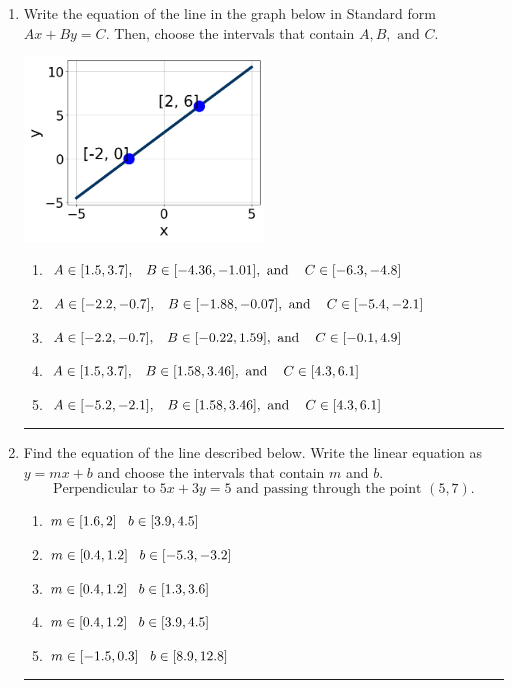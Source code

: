 \documentclass[14pt]{extbook}
\newcommand{\litem}[1]{\item#1\hspace*{-1cm}\rule{\textwidth}{0.4pt}}
\begin{document}
\begin{enumerate}
\litem{
Write the equation of the line in the graph below in Standard form $Ax+By=C$. Then, choose the intervals that contain $A, B, \text{ and } C$.
\begin{center}
    \includegraphics[width=0.5\textwidth]{../Figures/linearGraphToStandardA.png}
\end{center}
\begin{enumerate}[label=\Alph*.]
\item \( A \in [1.5, 3.7], \hspace{3mm} B \in [-4.36, -1.01], \text{ and } \hspace{3mm} C \in [-6.3, -4.8] \)
\item \( A \in [-2.2, -0.7], \hspace{3mm} B \in [-1.88, -0.07], \text{ and } \hspace{3mm} C \in [-5.4, -2.1] \)
\item \( A \in [-2.2, -0.7], \hspace{3mm} B \in [-0.22, 1.59], \text{ and } \hspace{3mm} C \in [-0.1, 4.9] \)
\item \( A \in [1.5, 3.7], \hspace{3mm} B \in [1.58, 3.46], \text{ and } \hspace{3mm} C \in [4.3, 6.1] \)
\item \( A \in [-5.2, -2.1], \hspace{3mm} B \in [1.58, 3.46], \text{ and } \hspace{3mm} C \in [4.3, 6.1] \)

\end{enumerate} }
\litem{
Find the equation of the line described below. Write the linear equation as $ y=mx+b $ and choose the intervals that contain $m$ and $b$.\[ \text{Perpendicular to } 5 x + 3 y = 5 \text{ and passing through the point } (5, 7). \]\begin{enumerate}[label=\Alph*.]
\item \( m \in [1.6, 2] \hspace*{3mm} b \in [3.9, 4.5] \)
\item \( m \in [0.4, 1.2] \hspace*{3mm} b \in [-5.3, -3.2] \)
\item \( m \in [0.4, 1.2] \hspace*{3mm} b \in [1.3, 3.6] \)
\item \( m \in [0.4, 1.2] \hspace*{3mm} b \in [3.9, 4.5] \)
\item \( m \in [-1.5, 0.3] \hspace*{3mm} b \in [8.9, 12.8] \)


\end{enumerate}}
\end{enumerate}
\end{document}
